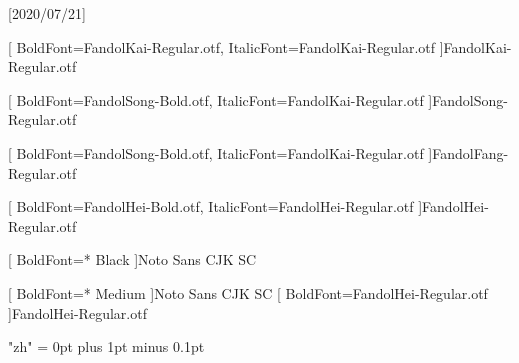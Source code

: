 
[2020/07/21]

\setsansfont{TeX Gyre Heros}	%






[
	BoldFont=FandolKai-Regular.otf, ItalicFont=FandolKai-Regular.otf
]{FandolKai-Regular.otf}

[
	BoldFont=FandolSong-Bold.otf,
	ItalicFont=FandolKai-Regular.otf
]{FandolSong-Regular.otf}

[
	BoldFont=FandolSong-Bold.otf,
	ItalicFont=FandolKai-Regular.otf
]{FandolFang-Regular.otf}

[
	BoldFont=FandolHei-Bold.otf,
	ItalicFont=FandolHei-Regular.otf
]{FandolHei-Regular.otf}


[
	BoldFont=* Black
]{Noto Sans CJK SC}

[
	BoldFont=* Medium
]{Noto Sans CJK SC}	%
[
	BoldFont=FandolHei-Regular.otf
]{FandolHei-Regular.otf}	%

\XeTeXlinebreaklocale "zh"
\XeTeXlinebreakskip = 0pt plus 1pt minus 0.1pt

\newcommand\kaishu{\CJKfamily{kai}} %
\newcommand\songti{\CJKfamily{song}} %
\newcommand\heiti{\CJKfamily{hei}}	%
\newcommand\thmheiti{\CJKfamily{hei2}}	%
\newcommand\fangsong{\CJKfamily{fangsong}} %
\renewcommand{\em}{\bfseries\mathversion{bold}\CJKfamily{emfont}} %